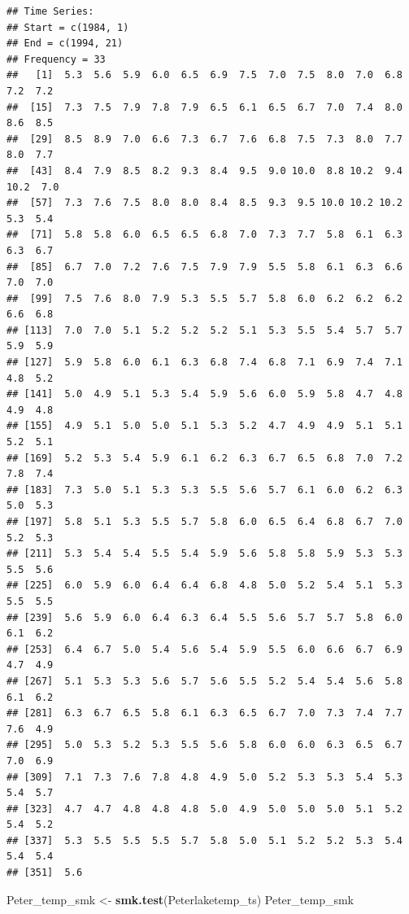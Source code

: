 \documentclass[12pt,]{article}
\newenvironment{Shaded}{\begin{snugshade}}{\end{snugshade}}
\newcommand{\KeywordTok}[1]{\textcolor[rgb]{0.13,0.29,0.53}{\textbf{#1}}}
\newcommand{\StringTok}[1]{\textcolor[rgb]{0.31,0.60,0.02}{#1}}
\newcommand{\NormalTok}[1]{#1}
\begin{document}
\begin{verbatim}
## Time Series:
## Start = c(1984, 1) 
## End = c(1994, 21) 
## Frequency = 33 
##   [1]  5.3  5.6  5.9  6.0  6.5  6.9  7.5  7.0  7.5  8.0  7.0  6.8  7.2  7.2
##  [15]  7.3  7.5  7.9  7.8  7.9  6.5  6.1  6.5  6.7  7.0  7.4  8.0  8.6  8.5
##  [29]  8.5  8.9  7.0  6.6  7.3  6.7  7.6  6.8  7.5  7.3  8.0  7.7  8.0  7.7
##  [43]  8.4  7.9  8.5  8.2  9.3  8.4  9.5  9.0 10.0  8.8 10.2  9.4 10.2  7.0
##  [57]  7.3  7.6  7.5  8.0  8.0  8.4  8.5  9.3  9.5 10.0 10.2 10.2  5.3  5.4
##  [71]  5.8  5.8  6.0  6.5  6.5  6.8  7.0  7.3  7.7  5.8  6.1  6.3  6.3  6.7
##  [85]  6.7  7.0  7.2  7.6  7.5  7.9  7.9  5.5  5.8  6.1  6.3  6.6  7.0  7.0
##  [99]  7.5  7.6  8.0  7.9  5.3  5.5  5.7  5.8  6.0  6.2  6.2  6.2  6.6  6.8
## [113]  7.0  7.0  5.1  5.2  5.2  5.2  5.1  5.3  5.5  5.4  5.7  5.7  5.9  5.9
## [127]  5.9  5.8  6.0  6.1  6.3  6.8  7.4  6.8  7.1  6.9  7.4  7.1  4.8  5.2
## [141]  5.0  4.9  5.1  5.3  5.4  5.9  5.6  6.0  5.9  5.8  4.7  4.8  4.9  4.8
## [155]  4.9  5.1  5.0  5.0  5.1  5.3  5.2  4.7  4.9  4.9  5.1  5.1  5.2  5.1
## [169]  5.2  5.3  5.4  5.9  6.1  6.2  6.3  6.7  6.5  6.8  7.0  7.2  7.8  7.4
## [183]  7.3  5.0  5.1  5.3  5.3  5.5  5.6  5.7  6.1  6.0  6.2  6.3  5.0  5.3
## [197]  5.8  5.1  5.3  5.5  5.7  5.8  6.0  6.5  6.4  6.8  6.7  7.0  5.2  5.3
## [211]  5.3  5.4  5.4  5.5  5.4  5.9  5.6  5.8  5.8  5.9  5.3  5.3  5.5  5.6
## [225]  6.0  5.9  6.0  6.4  6.4  6.8  4.8  5.0  5.2  5.4  5.1  5.3  5.5  5.5
## [239]  5.6  5.9  6.0  6.4  6.3  6.4  5.5  5.6  5.7  5.7  5.8  6.0  6.1  6.2
## [253]  6.4  6.7  5.0  5.4  5.6  5.4  5.9  5.5  6.0  6.6  6.7  6.9  4.7  4.9
## [267]  5.1  5.3  5.3  5.6  5.7  5.6  5.5  5.2  5.4  5.4  5.6  5.8  6.1  6.2
## [281]  6.3  6.7  6.5  5.8  6.1  6.3  6.5  6.7  7.0  7.3  7.4  7.7  7.6  4.9
## [295]  5.0  5.3  5.2  5.3  5.5  5.6  5.8  6.0  6.0  6.3  6.5  6.7  7.0  6.9
## [309]  7.1  7.3  7.6  7.8  4.8  4.9  5.0  5.2  5.3  5.3  5.4  5.3  5.4  5.7
## [323]  4.7  4.7  4.8  4.8  4.8  5.0  4.9  5.0  5.0  5.0  5.1  5.2  5.4  5.2
## [337]  5.3  5.5  5.5  5.5  5.7  5.8  5.0  5.1  5.2  5.2  5.3  5.4  5.4  5.4
## [351]  5.6
\end{verbatim}

\begin{Shaded}
\begin{Highlighting}[]
\NormalTok{Peter_temp_smk <-}\StringTok{ }\KeywordTok{smk.test}\NormalTok{(Peterlaketemp_ts)}
\NormalTok{Peter_temp_smk}
\end{Highlighting}
\end{Shaded}
\end{document}
